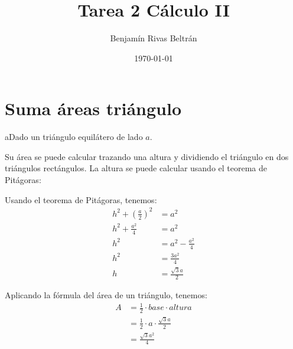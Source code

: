 \documentclass{article}
\title{Tarea 2 Cálculo II}
\author{Benjamín Rivas Beltrán}
\date{\today}
\begin{document}
\maketitle

\section{Suma áreas triángulo}

aDado un triángulo equilátero de lado $a$.

\begin{center}
\end{center}

Su área se puede calcular trazando una altura y dividiendo el triángulo en dos triángulos rectángulos. La altura se puede calcular usando el teorema de Pitágoras:

\begin{center}
\end{center}

Usando el teorema de Pitágoras, tenemos:
\begin{align*}
h^2 + \left(\frac{a}{2}\right)^2 &= a^2 \\
h^2 + \frac{a^2}{4} &= a^2 \\
h^2 &= a^2 - \frac{a^2}{4} \\
h^2 &= \frac{3a^2}{4} \\
h &= \frac{\sqrt{3}a}{2}
\end{align*}

Aplicando la fórmula del área de un triángulo, tenemos:
\begin{align*}
A &= \frac{1}{2} \cdot base \cdot altura \\
&= \frac{1}{2} \cdot a \cdot \frac{\sqrt{3}a}{2} \\
&= \frac{\sqrt{3}a^2}{4}
\end{align*}
\end{document}
